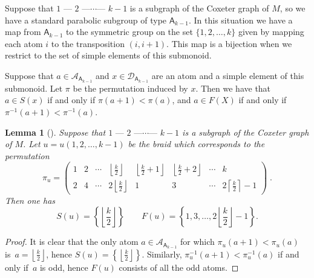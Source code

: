 \documentclass[a4paper,final]{article}
\theoremstyle{plain}
\newtheorem{lemma}[lemma]{Lemma}
\theoremstyle{remark}
\theoremstyle{definition}
\begin{document}
Suppose that $1 \text{ --- } 2 \text{ ---} \cdots \text{--- } k-1$ is
a subgraph of the Coxeter graph of $M$, so we have a standard
parabolic subgroup of type ${\mathsf{{A}}}_{k-1}$.  In this situation we
have a map from ${\mathsf{{A}}}_{k-1}$ to the symmetric group on the set
$\{ 1, 2, \ldots, k \}$ given by mapping each atom $i$ to the
transposition $(i, i+1)$.  This map is a bijection when we restrict to
the set of simple elements of this submonoid.

Suppose that $a \in {\mathcal{A}}_{{\mathsf{{A}}}_{k-1}}$ and $x \in
{\mathcal{D}}_{{\mathsf{{A}}}_{k-1}}$ are an atom and a simple element of this
submonoid.  Let $\pi$ be the permutation induced by $x$.  Then we have
that $a \in {S}(x)$ if and only if $\pi(a+1) < \pi(a)$, and $a \in
{F}(X)$ if and only if $\pi^{-1}(a+1) < \pi^{-1}(a)$.

\begin{lemma}[\cite{Caruso13}]\label{one-to-many}
  Suppose that $1 \text{ --- } 2 \text{ ---} \cdots \text{--- } k-1$ is
  a subgraph of the Coxeter graph of $M$. Let $u = u(1,2,\ldots,k-1)$ be the
  braid which corresponds to the permutation
  \[ \pi_u = \left(\begin{array}{cccccccc}
      1 & 
      2 & 
      \cdots & 
      \left\lfloor \frac{k}{2} \right\rfloor &
      \left\lfloor \frac{k}{2} + 1 \right\rfloor &
      \left\lfloor \frac{k}{2} + 2 \right\rfloor &
      \cdots & 
      k \\
      2 &
      4 &
      \cdots & 
      2\left\lfloor \frac{k}{2} \right\rfloor &
      1 &
      3 &
      \cdots & 
      2\left\lceil \frac{k}{2} \right\rceil - 1
    \end{array}\right)
    \;.
  \]
  Then one has
  \[ 
  {S}(u) = \left\{\left\lfloor\frac{k}{2}\right\rfloor\right\}
  \qquad
  {F}(u) = \left\{1,3,\ldots,2\left\lfloor\frac{k}{2}\right\rfloor-1\right\}.
  \]
\end{lemma}
\begin{proof}
  It is clear that the only atom $a \in
  {\mathcal{A}}_{{\mathsf{{A}}}_{k-1}}$ for which $\pi_u(a+1) < \pi_u(a)$ is~$a=\left\lfloor\frac{k}{2}\right\rfloor$, hence ${S}(u) = \left\{\left\lfloor\frac{k}{2}\right\rfloor\right\}$.  Similarly,
  $\pi_u^{-1}(a+1) < \pi_u^{-1}(a)$ if and only if~$a$ is odd, hence
  ${F}(u)$ consists of all the odd atoms.
\end{proof}
\end{document}
